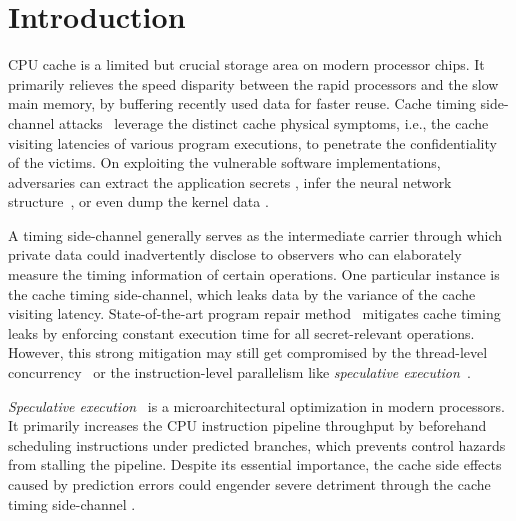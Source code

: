 \documentclass[sigconf,screen]{acmart}
\begin{document}
\maketitle

\renewcommand{\shortauthors}{Guo et al.}


\section{Introduction}
\label{sec:intro}


CPU cache is a limited but crucial storage area on modern processor chips. 
It primarily relieves the speed disparity between the rapid processors and 
the slow main memory, by buffering recently used data for faster reuse. Cache 
timing side-channel attacks~\cite{Kocher96,DhemKLMQW98} leverage the distinct 
cache physical symptoms, i.e., the cache visiting latencies of various program 
executions, to penetrate the confidentiality of the victims. 
On exploiting the vulnerable software implementations, adversaries can extract 
the application secrets
\cite{OsvikST06,TromerOS10,GullaschBK11,CGM16}, infer the neural network 
structure~\cite{YanFT18,HuLDLXJDLSX18,HongDKLRKDD18,DudduSRB18}, or even dump 
the kernel data
\cite{HundWH13,LippSGPHFHMKGYH18,KocherGGHHLMPSY19,WeisseVMGKPSSWY18}.


A timing side-channel generally serves as the intermediate carrier through
which private data could inadvertently disclose to observers who can elaborately 
measure the timing information of certain operations. One particular instance 
is the cache timing side-channel, which leaks data by the variance of the 
cache visiting latency. State-of-the-art program repair method~\cite{WuGSW18} 
mitigates cache timing leaks by enforcing constant execution time for all 
secret-relevant operations. However, this strong mitigation may still get 
compromised by the thread-level concurrency~\cite{GuoWW18} or the 
instruction-level parallelism like \textit{speculative execution}~\cite{kimuraKT1996}.


\textit{Speculative execution}~\cite{kimuraKT1996} is a microarchitectural 
optimization in modern processors. It primarily increases the CPU instruction 
pipeline throughput by beforehand scheduling instructions under predicted 
branches, which prevents control hazards from stalling the pipeline. Despite 
its essential importance, the cache side effects caused by prediction errors 
could engender severe detriment through the cache timing side-channel
\cite{KocherGGHHLMPSY19,BulckMWGKPSWYS18,WeisseVMGKPSSWY18,IslamMBKGES19}. 
\end{document}
